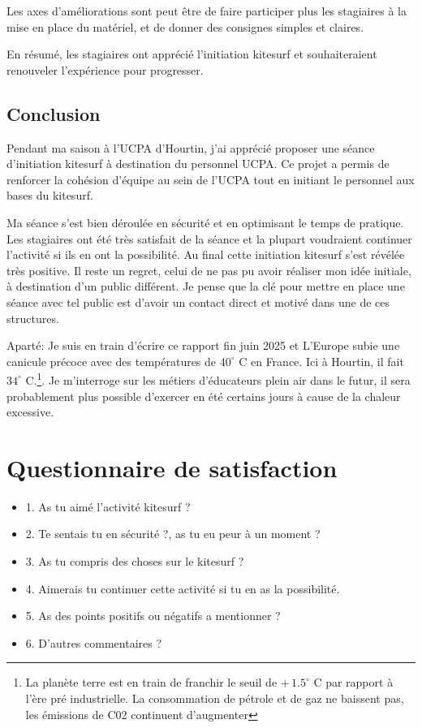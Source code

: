 \documentclass[11pt,a4paper]{report}
\begin{document}
Les axes d'améliorations sont peut \^etre de faire participer
plus les stagiaires à la mise en place du matériel, et de
donner des consignes simples et claires. 

En résumé, les stagiaires ont apprécié l'initiation kitesurf et
souhaiteraient renouveler l'expérience pour progresser.

\section{Conclusion}

Pendant ma saison à l'UCPA d'Hourtin, j'ai apprécié proposer une 
séance d'initiation kitesurf à destination du personnel UCPA.
Ce projet a permis de renforcer la cohésion d'équipe au sein de l'UCPA
tout en initiant le personnel aux bases du kitesurf. 

Ma séance s'est bien déroulée en sécurité et en optimisant 
le temps de pratique. Les stagiaires ont été très satisfait de la 
séance et la plupart voudraient continuer l'activité si ils en 
ont la possibilité. 
Au final cette initiation kitesurf s'est révélée très positive.
Il reste un regret, celui de ne pas pu avoir réaliser mon idée initiale, 
à destination d'un public différent. Je pense que la clé pour
mettre en place une séance avec tel public est d'avoir un contact
direct et motivé dans une de ces structures.

Aparté: Je suis en train d'écrire ce rapport fin juin 2025 et L’Europe subie
une canicule précoce avec des températures de $40^{\circ}$ C en France. Ici à Hourtin, 
il fait $34^{\circ}$ C.\footnote{
La planète terre est en train de franchir le seuil  de  $+\, 1.5^{\circ}$ C par rapport
 à l'ère pré industrielle. La consommation de pétrole et de gaz ne baissent pas, les 
émissions de C02 continuent d'augmenter\cite{giec}}.
Je m'interroge sur les métiers d'éducateurs plein air dans le futur, il sera
probablement plus possible d'exercer en été certains jours
à cause de la chaleur excessive.

\appendix
\appendixpage
\addappheadtotoc
\chapter{Questionnaire de satisfaction\label{questionnaire}}
\begin{itemize}
\item 1. As tu aimé l'activité kitesurf ?
\item 2. Te sentais tu en sécurité ?, as tu eu peur à un moment ?
\item 3. As tu compris des choses sur le kitesurf ?
\item 4. Aimerais tu continuer cette activité si tu en as la possibilité.
\item 5. As des points positifs ou négatifs a mentionner ?
\item 6. D'autres commentaires ?
\end{itemize}
\end{document}
